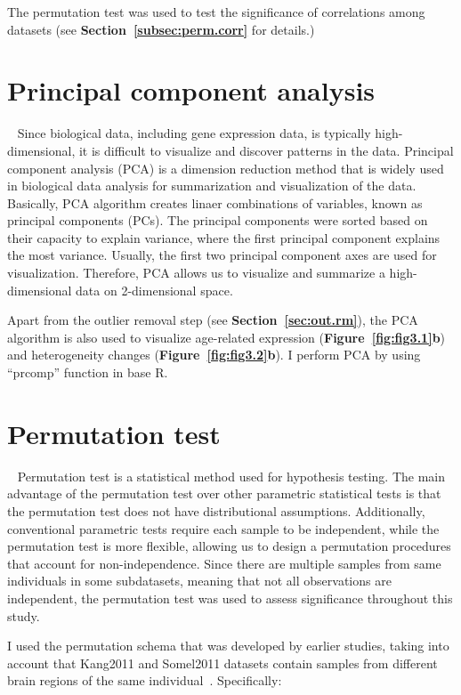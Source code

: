 The permutation test was used to test the significance of correlations among datasets (see \textbf{Section~\ref{subsec:perm.corr}} for details.)

\section{Principal component analysis}~\label{sec:pca}
Since biological data, including gene expression data, is typically high-dimensional, it is difficult to visualize and discover patterns in the data.
Principal component analysis (PCA) is a dimension reduction method that is widely used in biological data analysis for summarization and visualization of the data.
Basically, PCA algorithm creates linaer combinations of variables, known as principal components (PCs). 
The principal components were sorted based on their capacity to explain variance, where the first principal component explains the most variance.
Usually, the first two principal component axes are used for visualization. 
Therefore, PCA allows us to visualize and summarize a high-dimensional data on 2-dimensional space.

Apart from the outlier removal step (see \textbf{Section~\ref{sec:out.rm}}), 
the PCA algorithm is also used to visualize age-related expression (\textbf{Figure~\ref{fig:fig3.1}b}) and heterogeneity changes (\textbf{Figure~\ref{fig:fig3.2}b}).
I perform PCA by using ``prcomp'' function in base R.

\section{Permutation test}~\label{sec:perm}
Permutation test is a statistical method used for hypothesis testing. 
The main advantage of the permutation test over other parametric statistical tests is that the permutation test does not have distributional assumptions.
Additionally, conventional parametric tests require each sample to be independent, 
while the permutation test is more flexible, allowing us to design a permutation procedures that account for non-independence.
Since there are multiple samples from same individuals in some subdatasets, meaning that not all observations are independent, 
the permutation test was used to assess significance throughout this study.

I used the permutation schema that was developed by earlier studies, 
taking into account that Kang2011 and Somel2011 datasets contain samples from different brain regions of the same individual~\cite{Donertas2017,Donertas2018}.
Specifically: 

